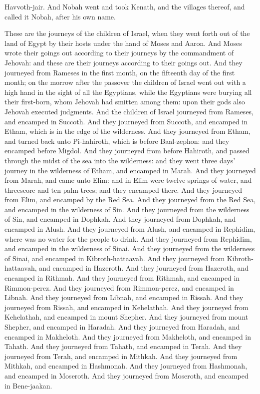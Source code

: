 Havvoth-jair. And Nobah went and took Kenath, and the villages thereof, and called it Nobah, after his own name. 

These are the journeys of the children of Israel, when they went forth out of the land of Egypt by their hosts under the hand of Moses and Aaron. And Moses wrote their goings out according to their journeys by the commandment of Jehovah: and these are their journeys according to their goings out. And they journeyed from Rameses in the first month, on the fifteenth day of the first month; on the morrow after the passover the children of Israel went out with a high hand in the sight of all the Egyptians, while the Egyptians were burying all their first-born, whom Jehovah had smitten among them: upon their gods also Jehovah executed judgments.  And the children of Israel journeyed from Rameses, and encamped in Succoth. And they journeyed from Succoth, and encamped in Etham, which is in the edge of the wilderness. And they journeyed from Etham, and turned back unto Pi-hahiroth, which is before Baal-zephon: and they encamped before Migdol. And they journeyed from before Hahiroth, and passed through the midst of the sea into the wilderness: and they went three days’ journey in the wilderness of Etham, and encamped in Marah. And they journeyed from Marah, and came unto Elim: and in Elim were twelve springs of water, and threescore and ten palm-trees; and they encamped there. And they journeyed from Elim, and encamped by the Red Sea. And they journeyed from the Red Sea, and encamped in the wilderness of Sin. And they journeyed from the wilderness of Sin, and encamped in Dophkah. And they journeyed from Dophkah, and encamped in Alush. And they journeyed from Alush, and encamped in Rephidim, where was no water for the people to drink. And they journeyed from Rephidim, and encamped in the wilderness of Sinai. And they journeyed from the wilderness of Sinai, and encamped in Kibroth-hattaavah. And they journeyed from Kibroth-hattaavah, and encamped in Hazeroth. And they journeyed from Hazeroth, and encamped in Rithmah. And they journeyed from Rithmah, and encamped in Rimmon-perez. And they journeyed from Rimmon-perez, and encamped in Libnah. And they journeyed from Libnah, and encamped in Rissah. And they journeyed from Rissah, and encamped in Kehelathah. And they journeyed from Kehelathah, and encamped in mount Shepher. And they journeyed from mount Shepher, and encamped in Haradah. And they journeyed from Haradah, and encamped in Makheloth. And they journeyed from Makheloth, and encamped in Tahath. And they journeyed from Tahath, and encamped in Terah. And they journeyed from Terah, and encamped in Mithkah. And they journeyed from Mithkah, and encamped in Hashmonah. And they journeyed from Hashmonah, and encamped in Moseroth. And they journeyed from Moseroth, and encamped in Bene-jaakan. 